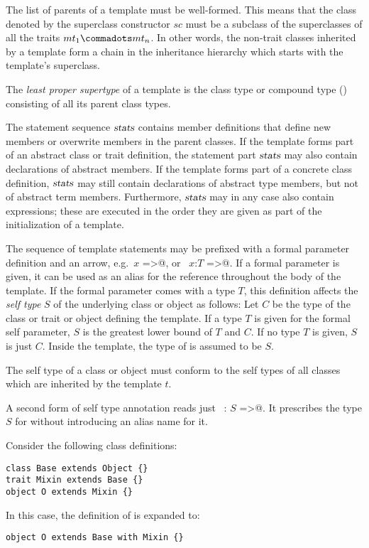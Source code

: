 The list of parents of a template must be well-formed. This means that
the class denoted by the superclass constructor $sc$ must be a
subclass of the superclasses of all the traits $mt_1 \commadots mt_n$.
In other words, the non-trait classes inherited by a template form a
chain in the inheritance hierarchy which starts with the template's
superclass.

The {\em least proper supertype} of a template is the class type or
compound type () consisting of all its parent
class types. 

The statement sequence $\mbox{\sl stats}$ contains member definitions that
define new members or overwrite members in the parent classes.  If the
template forms part of an abstract class or trait definition, the
statement part $\mbox{\sl stats}$ may also contain declarations of abstract
members. If the template forms part of a concrete class definition,
$\mbox{\sl stats}$ may still contain declarations of abstract type members, but
not of abstract term members.  Furthermore, $\mbox{\sl stats}$ may in any case
also contain expressions; these are executed in the order they are
given as part of the initialization of a template.

The sequence of template statements may be prefixed with a formal
parameter definition and an arrow, e.g.\ \lstinline@$x$ =>@, or
~\lstinline@$x$:$T$ =>@.  If a formal parameter is given, it can be
used as an alias for the reference \lstinline@this@ throughout the
body of the template.  
If the formal parameter comes with a type $T$, this definition affects
the {\em self type} $S$ of the underlying class or object as follows:  Let $C$ be the type
of the class or trait or object defining the template.
If a type $T$ is given for the formal self parameter, $S$
is the greatest lower bound of $T$ and $C$.
If no type $T$ is given, $S$ is just $C$.
Inside the template, the type of  is assumed to be $S$.

The self type of a class or object must conform to the self types of
all classes which are inherited by the template $t$. 

A second form of self type annotation reads just 
~\lstinline@this: $S$ =>@. It prescribes the type $S$ for \lstinline@this@
without introducing an alias name for it. 

\example Consider the following class definitions:

\begin{lstlisting}
class Base extends Object {}
trait Mixin extends Base {}
object O extends Mixin {}
\end{lstlisting}
In this case, the definition of  is expanded to:
\begin{lstlisting}
object O extends Base with Mixin {}
\end{lstlisting}

